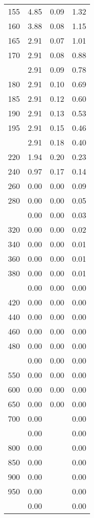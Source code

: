 \begin{table}[ht]
\begin{tabular}{lccc}
  155 & 4.85 & 0.09 & 1.32 \\ 
  160 & 3.88 & 0.08 & 1.15 \\ 
  165 & 2.91 & 0.07 & 1.01 \\ 
  170 & 2.91 & 0.08 & 0.88 \\ 
   \addlinespace
175 & 2.91 & 0.09 & 0.78 \\ 
  180 & 2.91 & 0.10 & 0.69 \\ 
  185 & 2.91 & 0.12 & 0.60 \\ 
  190 & 2.91 & 0.13 & 0.53 \\ 
  195 & 2.91 & 0.15 & 0.46 \\ 
   \addlinespace
200 & 2.91 & 0.18 & 0.40 \\ 
  220 & 1.94 & 0.20 & 0.23 \\ 
  240 & 0.97 & 0.17 & 0.14 \\ 
  260 & 0.00 & 0.00 & 0.09 \\ 
  280 & 0.00 & 0.00 & 0.05 \\ 
   \addlinespace
300 & 0.00 & 0.00 & 0.03 \\ 
  320 & 0.00 & 0.00 & 0.02 \\ 
  340 & 0.00 & 0.00 & 0.01 \\ 
  360 & 0.00 & 0.00 & 0.01 \\ 
  380 & 0.00 & 0.00 & 0.01 \\ 
   \addlinespace
400 & 0.00 & 0.00 & 0.00 \\ 
  420 & 0.00 & 0.00 & 0.00 \\ 
  440 & 0.00 & 0.00 & 0.00 \\ 
  460 & 0.00 & 0.00 & 0.00 \\ 
  480 & 0.00 & 0.00 & 0.00 \\ 
   \addlinespace
500 & 0.00 & 0.00 & 0.00 \\ 
  550 & 0.00 & 0.00 & 0.00 \\ 
  600 & 0.00 & 0.00 & 0.00 \\ 
  650 & 0.00 & 0.00 & 0.00 \\ 
  700 & 0.00 &  & 0.00 \\ 
   \addlinespace
750 & 0.00 &  & 0.00 \\ 
  800 & 0.00 &  & 0.00 \\ 
  850 & 0.00 &  & 0.00 \\ 
  900 & 0.00 &  & 0.00 \\ 
  950 & 0.00 &  & 0.00 \\ 
   \addlinespace
1000 & 0.00 &  & 0.00 \\ 
   \bottomrule
\end{tabular}
\end{table}
